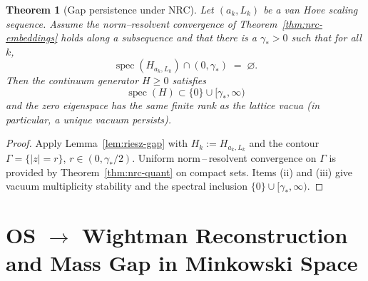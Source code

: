 \documentclass[11pt]{amsart}
\theoremstyle{plain}
\newtheorem{theorem}{Theorem}[section]
\theoremstyle{definition}
\theoremstyle{remark}
\begin{document}
\begin{theorem}[Gap persistence under NRC]\label{thm:gap-persist-nrc}
Let $(a_k,L_k)$ be a van Hove scaling sequence. Assume the norm--resolvent convergence of Theorem~\ref{thm:nrc-embeddings} holds along a subsequence and that there is a $\gamma_*>0$ such that for all $k$,
\[
  \operatorname{spec}(H_{a_k,L_k})\cap(0,\gamma_*)\;=\;\varnothing.
\]
Then the continuum generator $H\ge 0$ satisfies
\begin{equation}
  \boxed{\operatorname{spec}(H)\subset \{0\}\cup[\gamma_*,\infty)}
\end{equation}
and the zero eigenspace has the same finite rank as the lattice vacua (in particular, a unique vacuum persists).
\end{theorem}
\begin{proof}
Apply Lemma~\ref{lem:riesz-gap} with $H_k:=H_{a_k,L_k}$ and the contour $\Gamma=\{ |z|=r\}$, $r\in(0,\gamma_*/2)$. Uniform norm\,–\,resolvent convergence on $\Gamma$ is provided by Theorem~\ref{thm:nrc-quant} on compact sets. Items (ii) and (iii) give vacuum multiplicity stability and the spectral inclusion $\{0\}\cup[\gamma_*,\infty)$.
\end{proof}

\vspace{12pt}
\section{OS $\to$ Wightman Reconstruction and Mass Gap in Minkowski Space}
\end{document}
